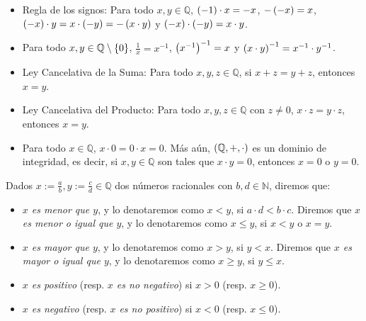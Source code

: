\begin{proposition}
\begin{itemize}
\begin{itemize}
    \end{itemize}
    \item[3.] Regla de los signos: Para todo $x,y\in\mathbb{Q}$, $\left(-1\right)\cdot x=-x$, $-\left(-x\right)=x$, $\left(-x\right)\cdot y=x\cdot\left(-y\right)=-\left(x\cdot y\right)$ y $\left(-x\right)\cdot\left(-y\right)=x\cdot y$.
    \item[4.] Para todo $x,y\in\mathbb{Q}\setminus\left\{0\right\}$, $\frac{1}{x}=x^{-1}$, $\left(x^{-1}\right)^{-1}=x$ y $\left(x\cdot y\right)^{-1}=x^{-1}\cdot y^{-1}$.
    \item[5.] Ley Cancelativa de la Suma: Para todo $x,y,z\in\mathbb{Q}$, si $x+z=y+z$, entonces $x=y$.
    \item[6.] Ley Cancelativa del Producto: Para todo $x,y,z\in\mathbb{Q}$ con $z\neq 0$, $x\cdot z=y\cdot z$, entonces $x=y$.
    \item[7.] Para todo $x\in\mathbb{Q}$, $x\cdot 0=0\cdot x=0$. Más aún, $\left(\mathbb{Q},+,\cdot\right)$ es un dominio de integridad, es decir, si $x,y\in\mathbb{Q}$ son tales que $x\cdot y=0$, entonces $x=0$ o $y=0$.
\end{itemize}
\end{proposition}

\begin{definition}
  \rm Dados $x:=\frac{a}{b},y:=\frac{c}{d}\in\mathbb{Q}$ dos números racionales con $b,d\in\mathbb{N}$, diremos que:

  \begin{itemize}
    \item \textit{$x$ es menor que $y$}, y lo denotaremos como $x<y$, si $a\cdot d<b\cdot c$. Diremos que \textit{$x$ es menor o igual que $y$}, y lo denotaremos como $x\leq y$, si $x<y$ o $x=y$.
    \item \textit{$x$ es mayor que $y$}, y lo denotaremos como $x>y$, si $y<x$. Diremos que \textit{$x$ es mayor o igual que $y$}, y lo denotaremos como $x\geq y$, si $y\leq x$.
    \item \textit{$x$ es positivo} (resp. \textit{$x$ es no negativo}) si $x>0$ (resp. $x\geq 0$).
    \item \textit{$x$ es negativo} (resp. \textit{$x$ es no positivo}) si $x<0$ (resp. $x\leq 0$).
  \end{itemize}
\end{definition}

